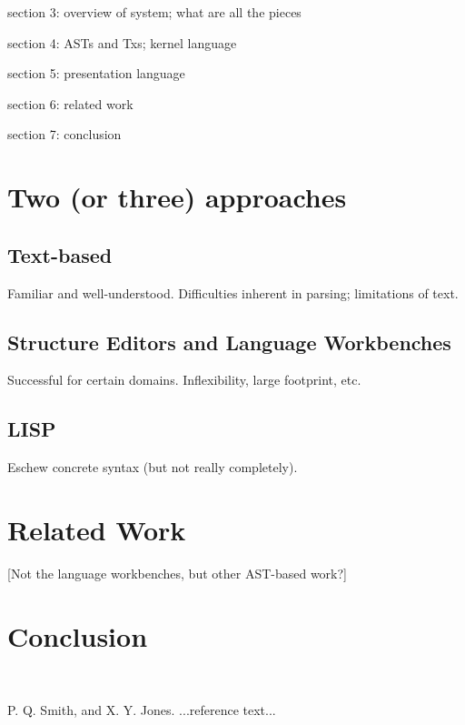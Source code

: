 \documentclass[preprint]{sigplanconf}
\begin{document}
section 3: overview of system; what are all the pieces

section 4: ASTs and Txs; kernel language

section 5: presentation language

section 6: related work

section 7: conclusion




\section{Two (or three) approaches}
\subsection{Text-based}
Familiar and well-understood. Difficulties inherent in parsing; limitations of text.

\subsection{Structure Editors and Language Workbenches}
Successful for certain domains. Inflexibility, large footprint, etc.

\subsection{LISP}
Eschew concrete syntax (but not really completely).







\section{Related Work}
[Not the language workbenches, but other AST-based work?]

\section{Conclusion}
~









\begin{thebibliography}{}
\softraggedright

P. Q. Smith, and X. Y. Jones. ...reference text...

\end{thebibliography}
\end{document}
